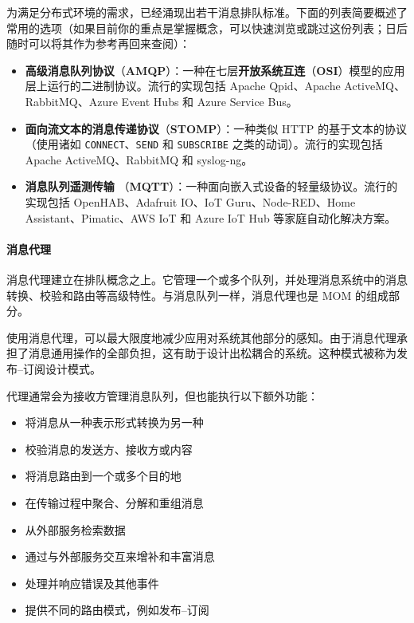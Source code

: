 为满足分布式环境的需求，已经涌现出若干消息排队标准。下面的列表简要概述了常用的选项（如果目前你的重点是掌握概念，可以快速浏览或跳过这份列表；日后随时可以将其作为参考再回来查阅）：

\begin{itemize}
\label{idx:1346}
\label{idx:1347}
\item \textbf{高级消息队列协议}（\textbf{AMQP}）：一种在七层\textbf{开放系统互连}（\textbf{OSI}）模型的应用层上运行的二进制协议。流行的实现包括 Apache Qpid、Apache ActiveMQ、RabbitMQ、Azure Event Hubs 和 Azure Service Bus。
\label{idx:1348}
\item \textbf{面向流文本的消息传递协议}（\textbf{STOMP}）：一种类似 HTTP 的基于文本的协议（使用诸如 \texttt{CONNECT}、\texttt{SEND} 和 \texttt{SUBSCRIBE} 之类的动词）。流行的实现包括 Apache ActiveMQ、RabbitMQ 和 syslog-ng。
\label{idx:1349}
\item \textbf{消息队列遥测传输 }（\textbf{MQTT}）：一种面向嵌入式设备的轻量级协议。流行的实现包括 OpenHAB、Adafruit IO、IoT Guru、Node-RED、Home Assistant、Pimatic、AWS IoT 和 Azure IoT Hub 等家庭自动化解决方案。
\end{itemize}

\paragraph{消息代理}

\label{idx:1350}
\label{idx:1351}
消息代理建立在排队概念之上。它管理一个或多个队列，并处理消息系统中的消息转换、校验和路由等高级特性。与消息队列一样，消息代理也是 MOM 的组成部分。

使用消息代理，可以最大限度地减少应用对系统其他部分的感知。由于消息代理承担了消息通用操作的全部负担，这有助于设计出松耦合的系统。这种模式被称为发布–订阅设计模式。


代理通常会为接收方管理消息队列，但也能执行以下额外功能：

\begin{itemize}
\item 将消息从一种表示形式转换为另一种
\item 校验消息的发送方、接收方或内容
\item 将消息路由到一个或多个目的地
\item 在传输过程中聚合、分解和重组消息
\item 从外部服务检索数据
\item 通过与外部服务交互来增补和丰富消息
\item 处理并响应错误及其他事件
\item 提供不同的路由模式，例如发布–订阅
\end{itemize}

